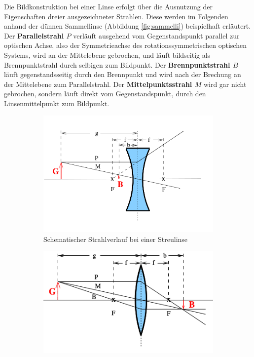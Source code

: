 Die Bildkonstruktion bei einer Linse erfolgt über die Ausnutzung der Eigenschaften dreier ausgezeichneter Strahlen.
Diese werden im Folgenden anhand der dünnen Sammellinse (Abbildung \ref{fig:sammelli}) beispielhaft erläutert.
Der \textbf{Parallelstrahl $P$} verläuft ausgehend vom Gegenstandspunkt parallel zur optischen Achse, also der Symmetrieachse des rotationssymmetrischen optischen Systems, wird an der Mittelebene gebrochen, und läuft bildseitig als Brennpunktstrahl durch selbigen zum Bildpunkt.
Der \textbf{Brennpunktstrahl $B$} läuft gegenstandsseitig durch den Brennpunkt und wird nach der Brechung an der Mittelebene zum Parallelstrahl.
Der \textbf{Mittelpunktsstrahl $M$} wird gar nicht gebrochen, sondern läuft direkt vom Gegenstandspunkt, durch den Linsenmittelpunkt zum Bildpunkt.
\begin{figure}
    \centering
    \begin{subfigure}[b]{0.3\textwidth}
      \includegraphics[width=\textwidth]{Bilder/streulinse.png}
      \caption{Schematischer Strahlverlauf bei einer Streulinse \cite{Anleitung}}
      \label{fig:streuli}
    \end{subfigure}
    \begin{subfigure}[b]{0.3\textwidth}
        \includegraphics[width=\textwidth]{Bilder/sammellinse.png}

\end{subfigure}
\end{figure}
